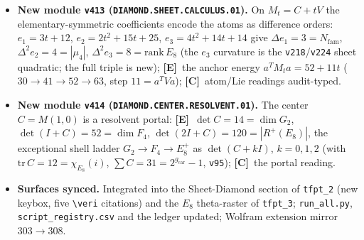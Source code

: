 \documentclass[11pt]{article}
\providecommand{\mE}{\textbf{[E]}}\providecommand{\mC}{\textbf{[C]}}
\providecommand{\vref}[1]{\texttt{#1}}
\providecommand{\gcar}{g_{\mathrm{car}}}\providecommand{\Nfam}{N_{\mathrm{fam}}}
\begin{document}
\begin{itemize}
$\det(I{+}J){=}12{=}\dim\mathfrak g_{\mathrm{SM}}$ and $\det(2I{+}J){=}40{=}|R(D_5)|$; \mC\ the Lie readings
audit-typed like the $G_2/F_4$ shadows.
\item \textbf{New module \texttt{v413} (\texttt{DIAMOND.SHEET.CALCULUS.01}).} On $M_t{=}C{+}tV$ the
elementary-symmetric coefficients encode the atoms as difference orders: $e_1{=}3t{+}12$, $e_2{=}2t^2{+}15t{+}25$,
$e_3{=}4t^2{+}14t{+}14$ give $\Delta e_1{=}3{=}\Nfam$, $\Delta^2 e_2{=}4{=}|\mu_4|$, $\Delta^2 e_3{=}8{=}\mathrm{rank}\,E_8$
(the $e_3$ curvature is the \vref{v218}/\vref{v224} sheet quadratic; the full triple is new); \mE\ the anchor energy
$a^TM_ta{=}52{+}11t$ ($30{\to}41{\to}52{\to}63$, step $11{=}a^TVa$); \mC\ atom/Lie readings audit-typed.
\item \textbf{New module \texttt{v414} (\texttt{DIAMOND.CENTER.RESOLVENT.01}).} The center $C{=}M(1,0)$ is a resolvent
portal: \mE\ $\det C{=}14{=}\dim G_2$, $\det(I{+}C){=}52{=}\dim F_4$, $\det(2I{+}C){=}120{=}|R^+(E_8)|$, the exceptional
shell ladder $G_2{\to}F_4{\to}E_8^+$ as $\det(C{+}kI)$, $k{=}0,1,2$ (with $\mathrm{tr}\,C{=}12{=}\chi_{E_8}(i)$,
$\sum C{=}31{=}2^{\gcar}{-}1$, \vref{v95}); \mC\ the portal reading.
\item \textbf{Surfaces synced.} Integrated into the Sheet-Diamond section of \texttt{tfpt\_2} (new keybox, five
\texttt{\textbackslash veri} citations) and the $E_8$ theta-raster of \texttt{tfpt\_3}; \texttt{run\_all.py},
\texttt{script\_registry.csv} and the ledger updated; Wolfram extension mirror $303\to308$.
\end{itemize}
\end{document}
